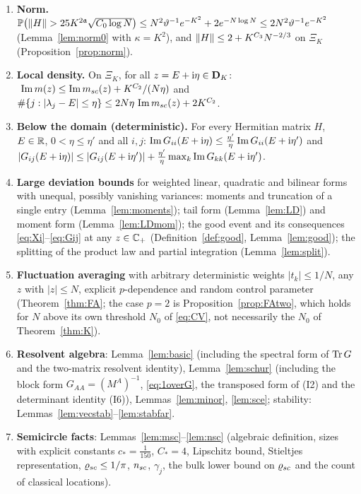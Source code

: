 \begin{enumerate}[label=\textbf{(X\arabic*)},leftmargin=3em,itemsep=3pt]
$\ \Lambda(z)\le K^{b+2}\big(\frac{\im\msc}{N\eta}+\frac1{(N\eta)^2}+\frac1N\big)$.
\item \textbf{Norm.} $\PP\big(\norm H>25K^{2\fa}\sqrt{C_0\log N}\big)\le N^2\vth^{-1}e^{-K^2}+2e^{-N\log N}\le2N^2\vth^{-1}e^{-K^2}$ (Lemma~\ref{lem:norm0} with $\kappa=K^2$), and $\|H\|\le2+K^{C_3}N^{-2/3}$ on $\Xi_K$ (Proposition~\ref{prop:norm}).
\item \textbf{Local density.} On $\Xi_K$, for all $z=E+\mathrm{i}\eta\in\mathbf{D}_K$: $\ \operatorname{Im} m(z)\le\operatorname{Im}m_{sc}(z)+K^{C_2}/(N\eta)$ and $\#\{j:|\lambda_j-E|\le\eta\}\le2N\eta\,\operatorname{Im}m_{sc}(z)+2K^{C_2}$.
\item \textbf{Below the domain (deterministic).} For every Hermitian matrix $H$, $E\in\mathbb{R}$, $0<\eta\le\eta'$ and all $i,j$:
$\operatorname{Im} G_{ii}(E+\mathrm{i}\eta)\le\frac{\eta'}\eta\operatorname{Im} G_{ii}(E+\mathrm{i}\eta')$ and
$|G_{ij}(E+\mathrm{i}\eta)|\le|G_{ij}(E+\mathrm{i}\eta')|+\frac{\eta'}{\eta}\max_k\operatorname{Im} G_{kk}(E+\mathrm{i}\eta')$.
\item \textbf{Large deviation bounds} for weighted linear, quadratic and bilinear forms with unequal, possibly vanishing variances: moments and truncation of a single entry (Lemma~\ref{lem:moments}); tail form (Lemma~\ref{lem:LD}) and moment form (Lemma~\ref{lem:LDmom});
the good event and its consequences \eqref{eq:Xi}--\eqref{eq:Gij} at any $z\in\mathbb{C}_+$ (Definition~\ref{def:good}, Lemma~\ref{lem:good}); the splitting of the product law and partial integration (Lemma~\ref{lem:split}).
\item \textbf{Fluctuation averaging} with arbitrary deterministic weights $|t_k|\le1/N$, any $z$ with $|z|\le N$, explicit $p$-dependence and random control parameter (Theorem~\ref{thm:FA}; the case $p=2$ is Proposition~\ref{prop:FAtwo}, which holds for $N$ above its own threshold $N_0$ of \eqref{eq:CV}, not necessarily the $N_0$ of Theorem~\ref{thm:K}).
\item \textbf{Resolvent algebra}: Lemma~\ref{lem:basic} (including the spectral form of $\operatorname{Tr} G$ and the two-matrix resolvent identity), Lemma~\ref{lem:schur} (including the block form $G_{AA}=(M^A)^{-1}$, \eqref{eq:1overG}, the transposed form of (I2) and the determinant identity (I6)),
Lemmas~\ref{lem:minor}, \ref{lem:sce}; stability: Lemmas~\ref{lem:vecstab}--\ref{lem:stabfar}.
\item \textbf{Semicircle facts}: Lemmas~\ref{lem:msc}--\ref{lem:nsc} (algebraic definition, sizes with explicit constants $c_*=\frac1{150}$, $C_*=4$, Lipschitz bound, Stieltjes representation, $\varrho_{sc}\le1/\pi$, $n_{sc}$, $\gamma_j$, the bulk lower bound on $\varrho_{sc}$ and the count of classical locations).

\end{enumerate}
